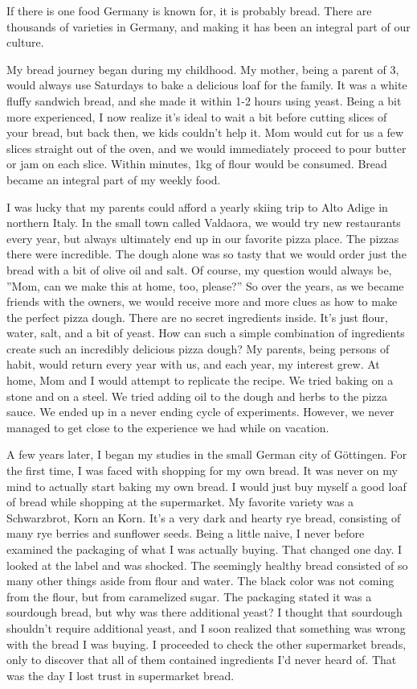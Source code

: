 If there is one food Germany is known for, it is probably bread.
There are thousands of varieties in Germany,
and making it has been an integral part of our culture.

My bread journey began during my childhood. My mother, being a parent
of 3, would always use Saturdays to bake a delicious loaf for the family.
It was a white fluffy sandwich bread, and she made it within 1-2 hours using yeast.
Being a bit more experienced, I now realize it's
ideal to wait a bit before cutting slices of your bread, but back then,
we kids couldn't help it. Mom would cut for us a few slices straight out of the oven, and we would
immediately proceed to pour butter or jam on each slice. Within minutes, 1kg of
flour would be consumed. Bread became an integral part of my weekly food.

I was lucky that my parents could afford a yearly skiing trip to
Alto Adige in northern Italy. In the small town called Valdaora, we
would try new restaurants every year, but always ultimately end up in our favorite
pizza place. The pizzas there were incredible. The dough
alone was so tasty that we would order just the bread with a
bit of olive oil and salt.
Of course, my question would always be, ''Mom, can we make this at home, too, please?''
So over the years, as we became friends with the owners, we would receive
more and more clues as how to make the perfect pizza dough. There
are no secret ingredients inside. It's just flour, water, salt, and a bit of yeast.
How can such a simple combination of ingredients create such an incredibly delicious
pizza dough? My parents, being persons of habit, would return every year with us,
and each year, my interest grew. At home, Mom and I would attempt to replicate
the recipe. We tried baking on a stone and on a steel. We tried adding oil to the dough and herbs
to the pizza sauce. We ended up in a never ending cycle of experiments. However, we never managed
to get close to the experience we had while on vacation.

A few years later, I began my studies in the small German city of Göttingen.
For the first time, I was faced with shopping for my own bread. It was never
on my mind to actually start baking my own bread. I would just buy myself
a good loaf of bread while shopping at the supermarket. My favorite variety
was a Schwarzbrot, Korn an Korn. It's a very dark and hearty rye bread,
consisting of many rye berries and sunflower seeds. Being a little naive,
I never before examined the packaging of what I was actually buying. That
changed one day. I looked at the label and was shocked. The seemingly
healthy bread consisted of so many other things aside from flour and water.
The black color was not coming from the flour, but from caramelized sugar.
The packaging stated it was a sourdough bread, but why was there additional yeast?
I thought that sourdough shouldn't require additional yeast, and I soon realized that
something was wrong with the bread I was buying.
I proceeded to check the other supermarket breads, only to discover that all of them
contained ingredients I'd never heard of. That was the day I lost trust
in supermarket bread.

